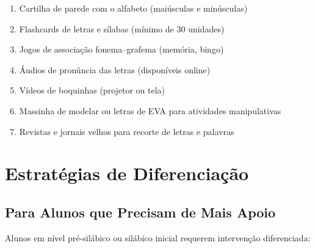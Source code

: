 \begin{enumerate}[leftmargin=2cm]
  \item Cartilha de parede com o alfabeto (mai\'{u}sculas e min\'{u}sculas)
  \item Flashcards de letras e s\'{i}labas (m\'{i}nimo de 30 unidades)
  \item Jogos de associa\c{c}\~{a}o fonema--grafema (mem\'{o}ria, bingo)
  \item \'{A}udios de pron\'{u}ncia das letras (dispon\'{i}veis online)
  \item V\'{i}deos de boquinhas (projetor ou tela)
  \item Massinha de modelar ou letras de EVA para atividades manipulativas
  \item Revistas e jornais velhos para recorte de letras e palavras
\end{enumerate}


\chapter{Estrat\'{e}gias de Diferencia\c{c}\~{a}o}

\section{Para Alunos que Precisam de Mais Apoio}

Alunos em n\'{i}vel pr\'{e}-sil\'{a}bico ou sil\'{a}bico inicial
requerem interven\c{c}\~{a}o diferenciada:

